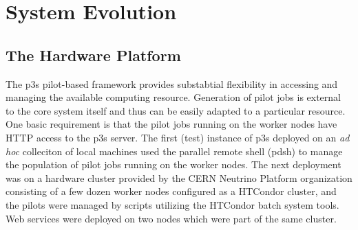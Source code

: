 \documentclass{webofc}
\begin{document}
\section{System Evolution}

\subsection{The Hardware Platform}
\label{sec:hardware}

The p3s pilot-based framework provides substabtial flexibility in accessing and
managing the available computing resource. Generation of pilot jobs is external
to the core system itself and thus can be easily adapted to a particular resource.
One basic requirement is that the pilot jobs running on the worker nodes have
HTTP access to the p3s server. The first (test) instance of p3s deployed
on an \textit{ad hoc} colleciton of local machines used the parallel remote shell
(pdsh) to manage the population of pilot jobs running on the worker nodes.
The next deployment was on a hardware cluster provided by the CERN
Neutrino Platform organization \cite{platform} consisting of a few dozen
worker nodes configured as a HTCondor cluster, and the pilots were managed
by scripts utilizing the HTCondor batch system tools. Web services were deployed
on two nodes which were part of the same cluster.



\end{document}
